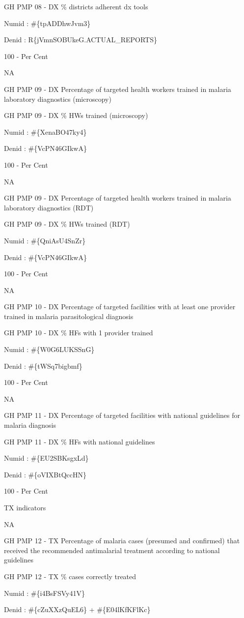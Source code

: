 \documentclass[]{book}
\begin{document}
GH PMP 08 - DX \% districts adherent dx tools

Numid : \#\{tpADDhwJvm3\}

Denid : R\{jVmnSOBUkeG.ACTUAL\_REPORTS\}

100 - Per Cent

NA

GH PMP 09 - DX Percentage of targeted health workers trained in malaria laboratory diagnostics (microscopy)

GH PMP 09 - DX \% HWs trained (microscopy)

Numid : \#\{XenaBO47ky4\}

Denid : \#\{VcPN46GIkwA\}

100 - Per Cent

NA

GH PMP 09 - DX Percentage of targeted health workers trained in malaria laboratory diagnostics (RDT)

GH PMP 09 - DX \% HWs trained (RDT)

Numid : \#\{QniAsU4SnZr\}

Denid : \#\{VcPN46GIkwA\}

100 - Per Cent

NA

GH PMP 10 - DX Percentage of targeted facilities with at least one provider trained in malaria parasitological diagnosis

GH PMP 10 - DX \% HFs with 1 provider trained

Numid : \#\{W0G6LUKSSnG\}

Denid : \#\{tWSq7bigbmf\}

100 - Per Cent

NA

GH PMP 11 - DX Percentage of targeted facilities with national guidelines for malaria diagnosis

GH PMP 11 - DX \% HFs with national guidelines

Numid : \#\{EU2SBKsgxLd\}

Denid : \#\{oVIXBtQccHN\}

100 - Per Cent

TX indicators

NA

GH PMP 12 - TX Percentage of malaria cases (presumed and confirmed) that received the recommended antimalarial treatment according to national guidelines

GH PMP 12 - TX \% cases correctly treated

Numid : \#\{i4BsFSVy41V\}

Denid : \#\{cZuXXzQuEL6\} + \#\{E04lKfKFlKc\}
\end{document}
